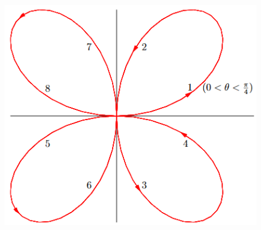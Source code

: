 \documentclass[12pt]{article}
\begin{document}
\newpage

\begin{figure}[hbt!]
\centering
\includegraphics[scale=0.5]{04_rosa-cuatro-petalos.jpg}
\end{figure}
\end{document}
